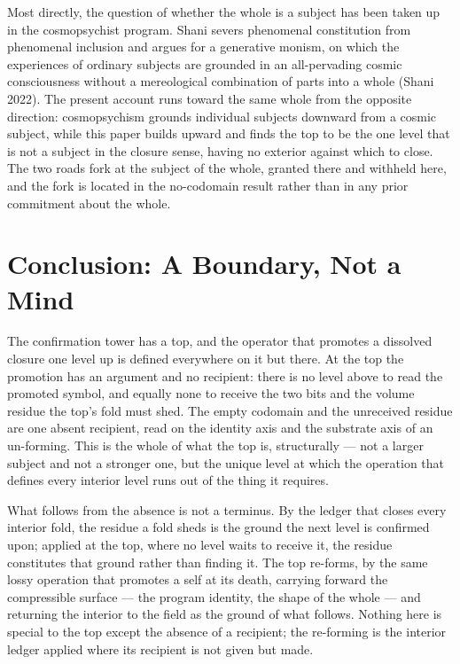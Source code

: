 \documentclass[11pt,oneside]{report}
\theoremstyle{definition}
\theoremstyle{remark}
\begin{document}
Most directly, the question of whether the whole is a subject has been taken up in the
cosmopsychist program. Shani severs phenomenal constitution from phenomenal inclusion and argues
for a generative monism, on which the experiences of ordinary subjects are grounded in an
all-pervading cosmic consciousness without a mereological combination of parts into a whole
(Shani 2022). The present account runs toward the same whole from the opposite direction:
cosmopsychism grounds individual subjects downward from a cosmic subject, while this paper builds
upward and finds the top to be the one level that is not a subject in the closure sense, having no
exterior against which to close. The two roads fork at the subject of the whole, granted there and
withheld here, and the fork is located in the no-codomain result rather than in any prior
commitment about the whole.

\section*{Conclusion: A Boundary, Not a Mind}

The confirmation tower has a top, and the operator that promotes a dissolved closure one level up is
defined everywhere on it but there. At the top the promotion has an argument and no recipient: there
is no level above to read the promoted symbol, and equally none to receive the two bits and the
volume residue the top's fold must shed. The empty codomain and the unreceived residue are one
absent recipient, read on the identity axis and the substrate axis of an un-forming. This is the
whole of what the top is, structurally --- not a larger subject and not a stronger one, but the
unique level at which the operation that defines every interior level runs out of the thing it
requires.

What follows from the absence is not a terminus. By the ledger that closes every interior fold, the
residue a fold sheds is the ground the next level is confirmed upon; applied at the top, where no
level waits to receive it, the residue constitutes that ground rather than finding it. The top
re-forms, by the same lossy operation that promotes a self at its death, carrying forward the
compressible surface --- the program identity, the shape of the whole --- and returning the interior
to the field as the ground of what follows. Nothing here is special to the top except the absence of
a recipient; the re-forming is the interior ledger applied where its recipient is not given but made.
\end{document}
